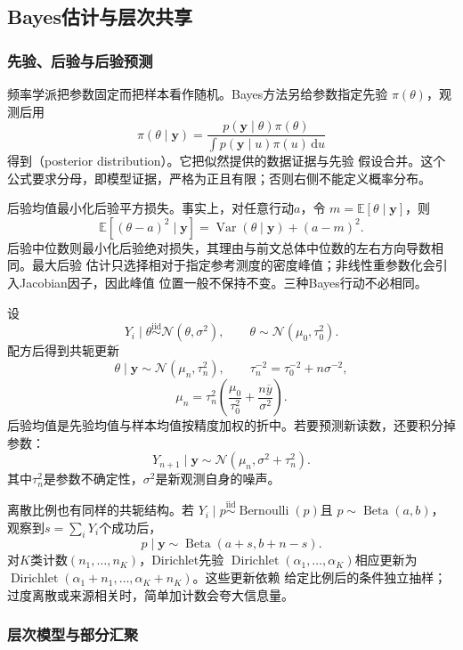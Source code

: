 \subsection{Bayes估计与层次共享}
\label{sec:statistics-bayes-hierarchy}

\subsubsection{先验、后验与后验预测}

频率学派把参数固定而把样本看作随机。Bayes方法另给参数指定先验
\(\pi(\theta)\)，观测后用
\[
  \pi(\theta\mid\bm y)
  =
  \frac{p(\bm y\mid\theta)\pi(\theta)}
       {\int p(\bm y\mid u)\pi(u)\,\mathrm du}
\]
得到（posterior distribution）。它把似然提供的数据证据与先验
假设合并。这个公式要求分母，即模型证据，严格为正且有限；否则右侧不能定义概率分布。

后验均值最小化后验平方损失。事实上，对任意行动\(a\)，令
\(m=\mathbb{E}[\theta\mid\bm y]\)，则
\[
  \mathbb{E}[(\theta-a)^2\mid\bm y]
  =\operatorname{Var}(\theta\mid\bm y)+(a-m)^2.
\]
后验中位数则最小化后验绝对损失，其理由与前文总体中位数的左右方向导数相同。最大后验
估计只选择相对于指定参考测度的密度峰值；非线性重参数化会引入Jacobian因子，因此峰值
位置一般不保持不变。三种Bayes行动不必相同。

设
\[
  Y_i\mid\theta\overset{\mathrm{iid}}{\sim}\mathcal N(\theta,\sigma^2),
  \qquad
  \theta\sim\mathcal N(\mu_0,\tau_0^2).
\]
配方后得到共轭更新
\[
  \theta\mid\bm y
  \sim\mathcal N(\mu_n,\tau_n^2),\qquad
  \tau_n^{-2}=\tau_0^{-2}+n\sigma^{-2},
\]
\[
  \mu_n=\tau_n^2
  \left(\frac{\mu_0}{\tau_0^2}+\frac{n\overline y}{\sigma^2}\right).
\]
后验均值是先验均值与样本均值按精度加权的折中。若要预测新读数，还要积分掉参数：
\[
  Y_{n+1}\mid\bm y
  \sim\mathcal N(\mu_n,\sigma^2+\tau_n^2).
\]
其中\(\tau_n^2\)是参数不确定性，\(\sigma^2\)是新观测自身的噪声。

离散比例也有同样的共轭结构。若
\(Y_i\mid p\overset{\mathrm{iid}}{\sim}\operatorname{Bernoulli}(p)\)且
\(p\sim\operatorname{Beta}(a,b)\)，观察到\(s=\sum_iY_i\)个成功后，
\[
  p\mid\bm y\sim\operatorname{Beta}(a+s,b+n-s).
\]
对\(K\)类计数\((n_1,\ldots,n_K)\)，Dirichlet先验
\(\operatorname{Dirichlet}(\alpha_1,\ldots,\alpha_K)\)相应更新为
\(\operatorname{Dirichlet}(\alpha_1+n_1,\ldots,\alpha_K+n_K)\)。这些更新依赖
给定比例后的条件独立抽样；过度离散或来源相关时，简单加计数会夸大信息量。

\subsubsection{层次模型与部分汇聚}

